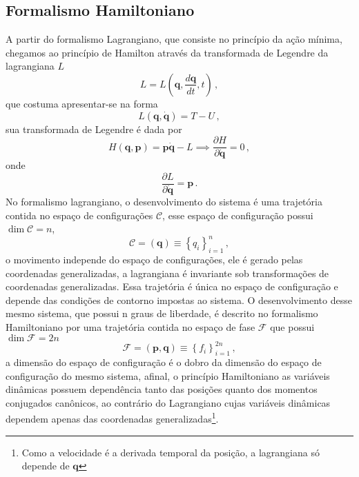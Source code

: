 \documentclass[25pt]{article}
\numberwithin{equation}{subsection} %
\begin{document}
\subsection{Formalismo Hamiltoniano}
A partir do formalismo Lagrangiano, que consiste no princípio da ação mínima, chegamos ao princípio de Hamilton através da transformada de Legendre da lagrangiana $L$
\begin{equation}
L=L\left(\mathbf{q},\frac{d\mathbf{q}}{dt},t\right)\,,
\end{equation}
que costuma apresentar-se na forma
\begin{equation}
L\left(\mathbf{q},\dot{\mathbf{q}}\right)=T-U\,,
\end{equation}
sua transformada de Legendre é dada por
\begin{displaymath}
H\left(\mathbf{q},\mathbf{p}\right)=\mathbf{p}\dot{\mathbf{q}}-L\implies \frac{\partial H}{\partial \dot{\mathbf{q}}}=0\,,
\end{displaymath}
onde
\begin{displaymath}
\frac{\partial L}{\partial \dot{\mathbf{q}}}=\mathbf{p}\,.
\end{displaymath}
No formalismo lagrangiano, o desenvolvimento do sistema é uma trajetória contida no espaço de configurações $\mathcal{C}$, esse espaço de configuração possui $\dim \mathcal{C}=n$,
\begin{displaymath}
\mathcal{C}=\left(\mathbf{q}\right)\equiv \left\{q_i\right\}_{i=1}^{n}\,,
\end{displaymath}
o movimento independe do espaço de configurações, ele é gerado pelas coordenadas generalizadas, a lagrangiana é invariante sob transformações de coordenadas generalizadas. Essa trajetória é única no espaço de configuração e depende das condições de contorno impostas ao sistema.
\bigbreak
O desenvolvimento desse mesmo sistema, que possui n graus de liberdade, é descrito no formalismo Hamiltoniano por uma trajetória contida no espaço de fase $\mathcal{F}$ que possui $\dim \mathcal{F}=2n$
\begin{displaymath}
\mathcal{F}=\left(\mathbf{p},\mathbf{q}\right)\equiv\left\{f_i\right\}_{i=1}^{2n}\,,
\end{displaymath}
a dimensão do espaço de configuração é o dobro da dimensão do espaço de configuração do mesmo sistema, afinal, o princípio Hamiltoniano as variáveis dinâmicas possuem dependência tanto das posições quanto dos momentos conjugados canônicos, ao contrário do Lagrangiano cujas variáveis dinâmicas dependem apenas das coordenadas generalizadas\footnote{Como a velocidade é a derivada temporal da posição, a lagrangiana só depende de $\mathbf{q}$}.
\end{document}
